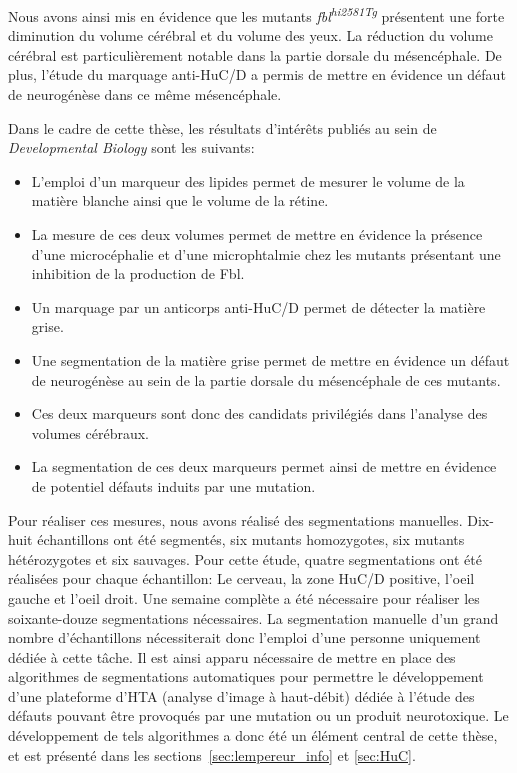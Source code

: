 \documentclass[\main/main.tex]{subfiles}
\begin{document}
%
Nous avons ainsi mis en évidence que les mutants \textit{fbl\textsuperscript{hi2581Tg}}
présentent une forte diminution du volume cérébral et du volume des yeux.
%
La réduction du volume cérébral est particulièrement notable
dans la partie dorsale du mésencéphale.
%
De plus, l'étude du marquage anti-HuC/D a permis de mettre en évidence
un défaut de neurogénèse dans ce même mésencéphale.

%
Dans le cadre de cette thèse, les résultats d'intérêts publiés au sein de
\emph{Developmental Biology}\citep{bouffard_2018} sont les suivants:

\begin{itemize}
    
    \item
    L'emploi d'un marqueur des lipides permet de mesurer le volume de la matière blanche
    ainsi que le volume de la rétine.
    
    \item
    La mesure de ces deux volumes permet de mettre en évidence la présence d'une microcéphalie
    et d'une microphtalmie chez les mutants présentant une inhibition de la production de Fbl.
    
    \item
    Un marquage par un anticorps anti-HuC/D permet de détecter la matière grise.
    
    \item
    Une segmentation de la matière grise permet de mettre en évidence
    un défaut de neurogénèse au sein de la partie dorsale du mésencéphale de ces mutants.
    
    \item
    Ces deux marqueurs sont donc des candidats privilégiés
    dans l'analyse des volumes cérébraux.
    
    \item
    La segmentation de ces deux marqueurs permet ainsi de mettre en évidence
    de potentiel défauts induits par une mutation.
    
\end{itemize}


%
Pour réaliser ces mesures, nous avons réalisé des segmentations manuelles.
%
Dix-huit échantillons ont été segmentés,
six mutants homozygotes, six mutants hétérozygotes et six sauvages.
%
Pour cette étude, quatre segmentations ont été réalisées pour chaque échantillon:
Le cerveau, la zone HuC/D positive, l'oeil gauche et l'oeil droit.
%
Une semaine complète a été nécessaire pour réaliser les soixante-douze segmentations nécessaires.
%
La segmentation manuelle d'un grand nombre d'échantillons
nécessiterait donc l'emploi d'une personne uniquement dédiée à cette tâche.
%
Il est ainsi apparu nécessaire de mettre en place des algorithmes de segmentations automatiques
pour permettre le développement d'une plateforme d'HTA (analyse d'image à haut-débit) dédiée à l'étude
des défauts pouvant être provoqués par une mutation ou un produit neurotoxique.
%
Le développement de tels algorithmes a donc été un élément central de cette thèse, et est présenté dans les sections~\ref{sec:lempereur_info} et \ref{sec:HuC}.
\end{document}
